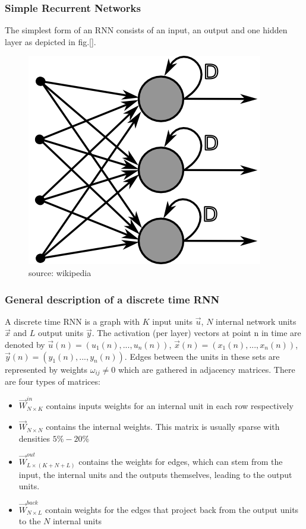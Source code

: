 \subsubsection*{Simple Recurrent Networks}
The simplest form of an RNN consists of an input, an output and one hidden layer as depicted in fig.[]. 
\begin{figure}
    \centering
    \includegraphics[width=.7\textwidth]{./img/simple_rnn.png}
    \caption{source: wikipedia}
\end{figure}

\subsubsection*{General description of a discrete time RNN}
A discrete time RNN is a graph with $K$ input units $\vec{u}$, $N$ internal network units $\vec{x}$ and $L$ output units $\vec{y}$. The activation (per layer) vectors at point n in time are denoted by $\vec{u}(n) = (u_1(n),...,u_n(n))$, $\vec{x}(n) = (x_1(n),...,x_n(n))$, $\vec{y}(n) = (y_1(n),...,y_n(n))$. Edges between the units in these sets are represented by weights $\omega_{ij}\neq0$ which are gathered in adjacency matrices. There are four types of matrices:\par
\begin{itemize}
	\item $\vec{W}^{in}_{N\times K}$ contains inputs weights for an internal unit in each row respectively 
	\item $\vec{W}_{N\times N}$ contains the internal weights. This matrix is usually sparse with densities $5\%-20\%$
	\item $\vec{W}^{out}_{L\times (K+N+L)}$ contains the weights for edges, which can stem from the input, the internal units and the outputs themselves, leading to the output units.
	\item $\vec{W}^{back}_{N\times L}$ contain weights for the edges that project back from the output units to the $N$ internal units
\end{itemize}

